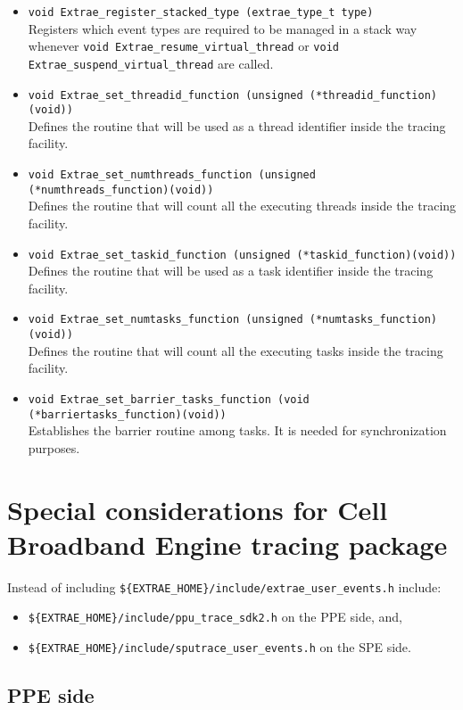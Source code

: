 \begin{itemize}
	\item {\tt void Extrae\_register\_stacked\_type (extrae\_type\_t type)}\\
	Registers which event types are required to be managed in a stack way whenever {\tt void Extrae\_resume\_virtual\_thread} or {\tt void Extrae\_suspend\_virtual\_thread} are called.
	\item {\tt void Extrae\_set\_threadid\_function (unsigned (*threadid\_function)(void))}\\
	Defines the routine that will be used as a thread identifier inside the tracing facility.
	\item {\tt void Extrae\_set\_numthreads\_function (unsigned (*numthreads\_function)(void))}\\
	Defines the routine that will count all the executing threads inside the tracing facility.
	\item {\tt void Extrae\_set\_taskid\_function (unsigned (*taskid\_function)(void))}\\
	Defines the routine that will be used as a task identifier inside the tracing facility.
	\item {\tt void Extrae\_set\_numtasks\_function (unsigned (*numtasks\_function)(void))}\\
	Defines the routine that will count all the executing tasks inside the tracing facility.
	\item {\tt void Extrae\_set\_barrier\_tasks\_function (void (*barriertasks\_function)(void))}\\
	Establishes the barrier routine among tasks. It is needed for synchronization purposes.
\end{itemize}

\section{Special considerations for Cell Broadband Engine tracing package}

Instead of including {\tt \$\{EXTRAE\_HOME\}/include/extrae\_user\_events.h} include:
\begin{itemize}
 \item {\tt \$\{EXTRAE\_HOME\}/include/ppu\_trace\_sdk2.h} on the PPE side, and,
 \item {\tt \$\{EXTRAE\_HOME\}/include/sputrace\_user\_events.h} on the SPE side.
\end{itemize}

\subsection{PPE side}\label{subsec:PPEside}

